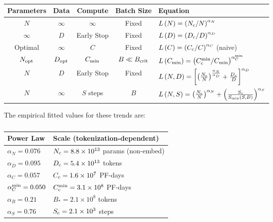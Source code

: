 \documentclass[english]{article}
\begin{document}
\begin{table}[h!]
\centering
\vspace{-0.5em}
\begin{tabular}{|c|c|c|c|l|}
\hline 
\textbf{Parameters}  & \textbf{Data}  & \textbf{Compute}  & \textbf{Batch Size}  & \textbf{Equation}\tabularnewline
\hline 
\hline 
$N$  & $\infty$  & \multicolumn{1}{c|}{$\infty$ } & Fixed  & $L\left(N\right)=\left(N_{{\rm c}}/N\right)^{\alpha_{N}}$\tabularnewline
\hline 
$\infty$  & $D$  & \multicolumn{1}{c|}{Early Stop } & Fixed  & $L\left(D\right)=\left(D_{{\rm c}}/D\right)^{\alpha_{D}}$\tabularnewline
\hline 
Optimal  & $\infty$  & $C$  & Fixed  & $L\left(C\right)=\left(C_{{\rm c}}/C\right)^{\alpha_{C}}$ (naive)\tabularnewline
\hline 
$N_{{\rm opt}}$ & $D_{{\rm opt}}$ & $C_{{\rm min}}$  & $B\ll B_{{\rm crit}}$  & $L\left(C_{{\rm min}}\right)=\left(C_{{\rm c}}^{{\rm min}}/C_{{\rm min}}\right)^{\alpha_{C}^{{\rm min}}}$\tabularnewline
\hline 
$N$  & $D$  & \multicolumn{1}{c|}{Early Stop } & Fixed  & $L\left(N,D\right)=\left[\left(\frac{N_{{\rm c}}}{N}\right)^{\frac{\alpha_{N}}{\alpha_{D}}}+\frac{D_{c}}{D}\right]^{\alpha_{D}}$\tabularnewline
\hline 
$N$  & $\infty$  & $S$ steps & $B$  & $L\left(N,S\right)=\left(\frac{N_{{\rm c}}}{N}\right)^{\alpha_{N}}+\left(\frac{S_{{\rm c}}}{S_{{\rm min}}\left(S,B\right)}\right)^{\alpha_{S}}$\tabularnewline
\hline 
\end{tabular}
\vspace{0.5em}
\caption[Key trend equations]{}
\vspace{-1em}
\end{table}

The empirical fitted values for these trends are:

\begin{table}[h!]
\centering
\vspace{-0.5em}
\begin{tabular}{|l|l|}
\hline 
\textbf{Power Law}  & \textbf{Scale (tokenization-dependent)}\tabularnewline
\hline 
\hline 
$\alpha_{N}=0.076$  & $N_{{\rm c}}=8.8\times10^{13}$ params (non-embed)\tabularnewline
\hline 
$\alpha_{D}=0.095$  & $D_{{\rm c}}=5.4\times10^{13}$ tokens\tabularnewline
\hline 
$\alpha_{C}=0.057$  & $C_{{\rm c}}=1.6\times10^{7}$ PF-days\tabularnewline
\hline 
$\alpha_{C}^{{\rm min}}=0.050$  & $C_{{\rm c}}^{{\rm min}}=3.1\times10^{8}$ PF-days\tabularnewline
\hline 
$\alpha_{B}=0.21$  & $B_{\ast}=2.1\times10^{8}$ tokens\tabularnewline
\hline 
$\alpha_{S}=0.76$  & $S_{{\rm c}}=2.1\times10^{3}$ steps\tabularnewline
\hline 
\end{tabular}
\vspace{0.5em}
\caption[Key parameters to trend fits]{}
\vspace{-1em}
\end{table}
\end{document}
